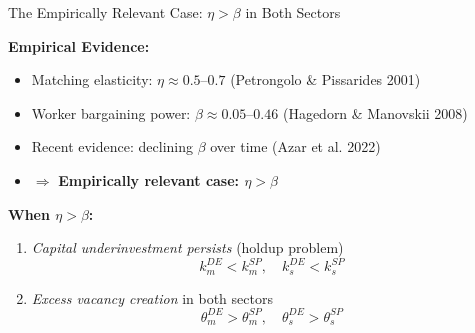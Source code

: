 \documentclass[9pt,xcolor={svgnames}]{beamer}
\begin{document}
\begin{frame}{The Empirically Relevant Case: $\eta > \beta$ in Both Sectors}

\textbf{Empirical Evidence:}
\begin{itemize}
\footnotesize 
    \item Matching elasticity: $\eta \approx 0.5$--$0.7$ {\scriptsize (Petrongolo \& Pissarides 2001)}
    
    \item Worker bargaining power: $\beta \approx 0.05$--$0.46$ {\scriptsize (Hagedorn \& Manovskii 2008)}
    
    \item Recent evidence: declining $\beta$ over time {\scriptsize (Azar et al. 2022)}
    
    \item $\Rightarrow$ \textbf{Empirically relevant case: $\eta > \beta$}
\end{itemize}

\vspace{0.3cm}

\textbf{When $\eta > \beta$:} 
\begin{enumerate}
     \item \textit{Capital underinvestment persists} (holdup problem)
    \[k_m^{DE} < k_m^{SP}, \quad k_s^{DE} < k_s^{SP}\]
    
    \item \textit{Excess vacancy creation} in both sectors 
    \[\theta_m^{DE} > \theta_m^{SP}, \quad \theta_s^{DE} > \theta_s^{SP}\]

\end{enumerate}
\footnotesize 



\end{frame}
\end{document}
